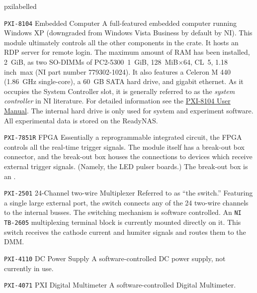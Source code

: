 \begin{labelled}{pxilabelled}

  \item[\pxislotone{} \texttt{PXI-8104}\hspace{.25em} Embedded Computer]
    A full-featured embedded computer running Windows XP (downgraded from Windows Vista Business by default by \gls{NI}).  This module ultimately controls all the other components in the crate.  It hosts an RDP server for remote login.  The maximum amount of RAM has been installed, 2~GiB, as two SO-DIMMs of PC2-5300~1~GiB, 128~MiB$\times$64, CL~5, 1.18\,inch~max (\gls{NI} part number 779302-1024).  It also features a Celeron M 440 (1.86~GHz single-core), a 60~GB SATA hard drive, and gigabit ethernet.  As it occupies the \gls{System Controller} slot, it is generally referred to as the \textit{system controller} in \gls{NI} literature.  For detailed information see the \href{National Instruments Manuals/NI PXI-8104 User Manual}{PXI-8104 User Manual}.  The internal hard drive is only used for system and experiment software.  All experimental data is stored on the \gls{ReadyNAS}.  

  \item[\pxislottwo{} \texttt{PXI-7851R}\hspace{.25em} \gls{FPGA}]
    Essentially a reprogrammable integrated circuit, the FPGA controls all the real-time trigger signals.  The module itself has a break-out box connector, and the break-out box houses the connections to devices which receive external trigger signals.  (Namely, the LED pulser boards.)  The break-out box is an .

  \item[\pxislotn{3} \texttt{PXI-2501}\hspace{.25em} 24-Channel two-wire Multiplexer]
    Referred to as ``the switch.''  Featuring a single large external port, the switch connects any of the 24 two-wire channels to the internal busses.  The switching mechanism is software controlled.  An \texttt{NI TB-2605} multiplexing terminal block is currently mounted directly on it.  This switch receives the cathode current and humiter signals and routes them to the DMM.

  \item[\pxislotn{4} \texttt{PXI-4110}\hspace{.25em} DC Power Supply]
    A software-controlled DC power supply, not currently in use.

  \item[\pxislotn{5} \texttt{PXI-4071}\hspace{.25em} PXI Digital Multimeter]
    A software-controlled Digital Multimeter.  


\end{labelled}
